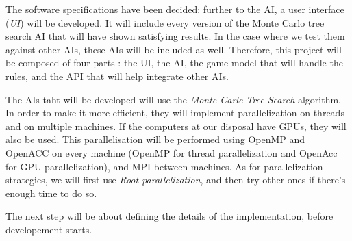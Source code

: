 The software specifications have been decided: further to the AI, a user interface (\emph{UI}) will be developed.
It will include every version of the Monte Carlo tree search AI that will have shown satisfying results.
In the case where we test them against other AIs, these AIs will be included as well.
Therefore, this project will be composed of four parts : the UI, the AI, the game model that will handle the rules, and the API that will help integrate other AIs.

The AIs taht will be developed will use the \emph{Monte Carle Tree Search} algorithm.
In order to make it more efficient, they will implement parallelization on threads and on multiple machines.
If the computers at our disposal have GPUs, they will also be used.
This parallelisation will be performed using OpenMP and OpenACC on every machine (OpenMP for thread parallelization and OpenAcc for GPU parallelization), and MPI between machines.
As for parallelization strategies, we will first use \emph{Root parallelization}, and then try other ones if there's enough time to do so.

The next step will be about defining the details of the implementation, before developement starts.